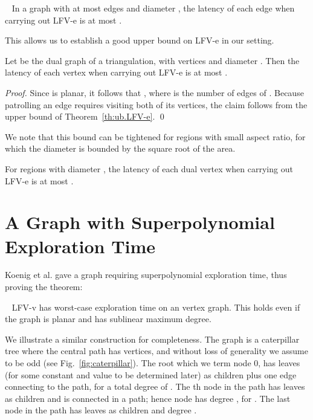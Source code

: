 \begin{theorem}
\label{th:ub.LFV-e}
~\cite{cik+-drwug-11} In a graph  with at most  edges and diameter , the latency of each edge when carrying out
LFV-e is at most .
\end{theorem}
This allows us to establish a good upper bound on LFV-e in our setting.
\begin{corollary}
\label{co:ub.LFV-e}
Let  be the dual graph of a triangulation, with  vertices and diameter . Then
the latency of each vertex when carrying out LFV-e is at most .
\end{corollary}

\begin{proof}
Since  is planar, it follows that , where  is the number of edges
of . Because patrolling an edge requires visiting both of its vertices, the claim follows from the
upper bound of Theorem~\ref{th:ub.LFV-e}.
\qed
\end{proof}

We note that this bound can be tightened for regions with small aspect ratio, for which
the diameter is bounded by the square root of the area.

\begin{corollary}
\label{co:aspect}
For regions with diameter , the
latency of each dual vertex when carrying out LFV-e is at most .
\end{corollary}

\section{A Graph with Superpolynomial Exploration Time}

Koenig et al. gave a graph requiring superpolynomial exploration time, thus proving the theorem:
\begin{theorem}
\label{co:ub.LFV-v}~\cite{ksl+-ants-01}
LFV-v has worst-case exploration time  on an  vertex graph. This holds even
if the graph is planar and has sublinear maximum degree.
\end{theorem}
We illustrate a similar construction for completeness. The graph is a caterpillar tree where the central path has  vertices,
and without loss of generality we assume  to be odd (see Fig.~\ref{fig:caterpillar}).
The root which we term node 0, has  leaves (for some constant  and value  to be determined later)
as children plus one edge connecting to the path, for a total degree of .
The th node in the path has  leaves as children and is connected
in a path; hence node  has degree , for .
The last node in the path has  leaves as children and degree .

